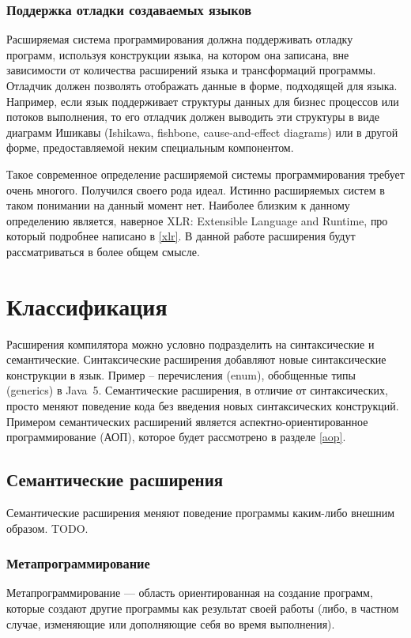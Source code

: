 \documentclass[a4paper,12pt]{article}
\begin{document}
\subsubsection{Поддержка отладки создаваемых языков}
Расширяемая система программирования должна поддерживать отладку программ,
используя конструкции языка, на котором она записана, вне зависимости от
количества расширений языка и трансформаций программы. Отладчик должен
позволять отображать данные в форме, подходящей для языка. Например, если язык
поддерживает структуры данных для бизнес процессов или потоков выполнения, то
его отладчик должен выводить эти структуры в виде диаграмм Ишикавы
\cite{ishikawa} (Ishikawa, fishbone, cause-and-effect diagrams) или в другой
форме, предоставляемой неким специальным компонентом.

Такое современное определение расширяемой системы программирования требует
очень многого. Получился своего рода идеал. Истинно расширяемых систем в таком
понимании на данный момент нет. Наиболее близким к данному определению
является, наверное XLR: Extensible Language and Runtime, про который подробнее
написано в \ref{xlr}. В данной работе расширения будут рассматриваться в более
общем смысле.

\section{Классификация}

Расширения компилятора можно условно подразделить на синтаксические и
семантические. Синтаксические расширения добавляют новые синтаксические
конструкции в язык. Пример -- перечисления (enum), обобщенные типы (generics) в
Java~5. Семантические расширения, в отличие от синтаксических, просто меняют
поведение кода без введения новых синтаксических конструкций. Примером
семантических расширений является аспектно-ориентированное программирование
(АОП), которое будет рассмотрено в разделе \ref{aop}.

\subsection{Семантические расширения}

Семантические расширения меняют поведение программы каким-либо внешним образом.
TODO.

\subsubsection{Метапрограммирование}
Метапрограммирование — область ориентированная на создание программ, которые
создают другие программы как результат своей работы (либо, в частном случае,
изменяющие или дополняющие себя во время выполнения).
\end{document}
